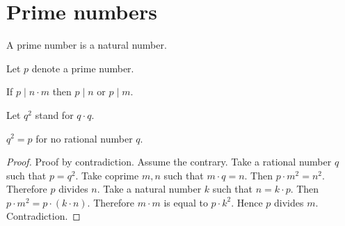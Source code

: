 \documentclass{article}
\begin{document}
  \section*{Prime numbers}

  \begin{forthel}
    \begin{signature}
      A prime number is a natural number.
    \end{signature}

    Let $p$ denote a prime number.

    \begin{axiom}
      If $p \mid n \cdot m$ then $p \mid n$ or $p \mid m$.
    \end{axiom}

    Let $q^{2}$ stand for $q \cdot q$.

    \begin{proposition}
      $q^{2} = p$ for no rational number $q$.
    \end{proposition}
    \begin{proof}
      Proof by contradiction. Assume the contrary. Take a rational number $q$ such that $p = q^{2}$. Take coprime $m,n$ such that $m \cdot q = n$. Then $p \cdot m^{2} = n^{2}$. Therefore $p$ divides $n$. Take a natural number $k$ such that $n = k \cdot p$. Then $p \cdot m^{2} = p \cdot (k \cdot n)$. Therefore $m \cdot m$ is equal to $p \cdot k^{2}$. Hence $p$ divides $m$. Contradiction.
    \end{proof}
  \end{forthel}
\end{document}
